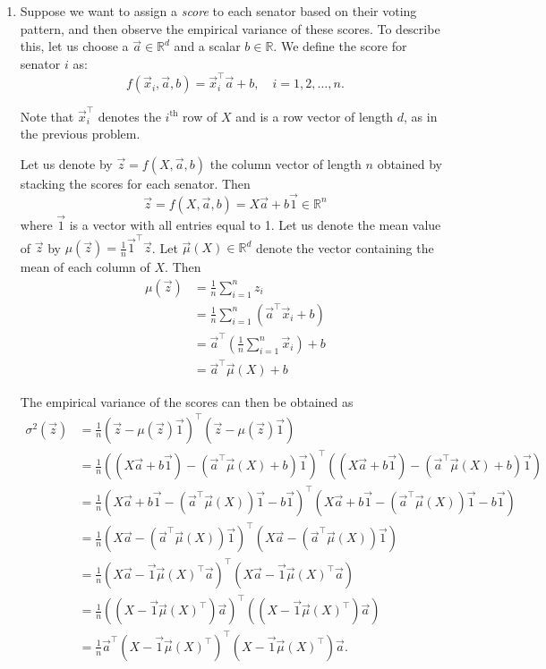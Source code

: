 \documentclass[10pt]{article}
\theoremstyle{definition}
\theoremstyle{plain}
\newcommand{\RR}{\mathbb{R}}
\begin{document}
\begin{enumerate}[label=(\alph*)]
\item Suppose we want to assign a \emph{score} to each senator based on their voting pattern, and then observe the empirical variance of these scores. To describe this, let us choose a $\vec{a} \in \RR^d$ and a scalar $b \in \RR$. We define the score for senator $i$ as:
\begin{equation}
f(\vec{x}_i, \vec{a}, b) = \vec{x}_i^\top \vec{a} + b, \quad i = 1, 2, \ldots, n.
\end{equation}

Note that $\vec{x}_i^\top$ denotes the $i^{\text{th}}$ row of $X$ and is a row vector of length $d$, as in the previous problem.

Let us denote by $\vec{z} = f(X, \vec{a}, b)$ the column vector of length $n$ obtained by stacking the scores for each senator. Then
\begin{equation}
\vec{z} = f(X, \vec{a}, b) = X\vec{a} + b\vec{1} \in \RR^n
\end{equation}
where $\vec{1}$ is a vector with all entries equal to 1. Let us denote the mean value of $\vec{z}$ by $\mu(\vec{z}) = \frac{1}{n}\vec{1}^\top \vec{z}$. Let $\vec{\mu}(X) \in \RR^d$ denote the vector containing the mean of each column of $X$. Then
\begin{align}
\mu(\vec{z}) &= \frac{1}{n}\sum_{i=1}^n z_i \\
&= \frac{1}{n}\sum_{i=1}^n \left(\vec{a}^\top \vec{x}_i + b\right) \\
&= \vec{a}^\top \left(\frac{1}{n}\sum_{i=1}^n \vec{x}_i\right) + b \\
&= \vec{a}^\top \vec{\mu}(X) + b
\end{align}

The empirical variance of the scores can then be obtained as
\begin{align}
\sigma^2(\vec{z}) &= \frac{1}{n}(\vec{z} - \mu(\vec{z})\vec{1})^\top(\vec{z} - \mu(\vec{z})\vec{1}) \\
&= \frac{1}{n}((X\vec{a} + b\vec{1}) - (\vec{a}^\top \vec{\mu}(X) + b)\vec{1})^\top((X\vec{a} + b\vec{1}) - (\vec{a}^\top \vec{\mu}(X) + b)\vec{1}) \\
&= \frac{1}{n}(X\vec{a} + b\vec{1} - (\vec{a}^\top \vec{\mu}(X))\vec{1} - b\vec{1})^\top(X\vec{a} + b\vec{1} - (\vec{a}^\top \vec{\mu}(X))\vec{1} - b\vec{1}) \\
&= \frac{1}{n}(X\vec{a} - (\vec{a}^\top \vec{\mu}(X))\vec{1})^\top(X\vec{a} - (\vec{a}^\top \vec{\mu}(X))\vec{1}) \\
&= \frac{1}{n}(X\vec{a} - \vec{1}\vec{\mu}(X)^\top \vec{a})^\top(X\vec{a} - \vec{1}\vec{\mu}(X)^\top \vec{a}) \\
&= \frac{1}{n}((X - \vec{1}\vec{\mu}(X)^\top)\vec{a})^\top((X - \vec{1}\vec{\mu}(X)^\top)\vec{a}) \\
&= \frac{1}{n}\vec{a}^\top (X - \vec{1}\vec{\mu}(X)^\top)^\top(X - \vec{1}\vec{\mu}(X)^\top)\vec{a}.
\end{align}


\end{enumerate}
\end{document}
